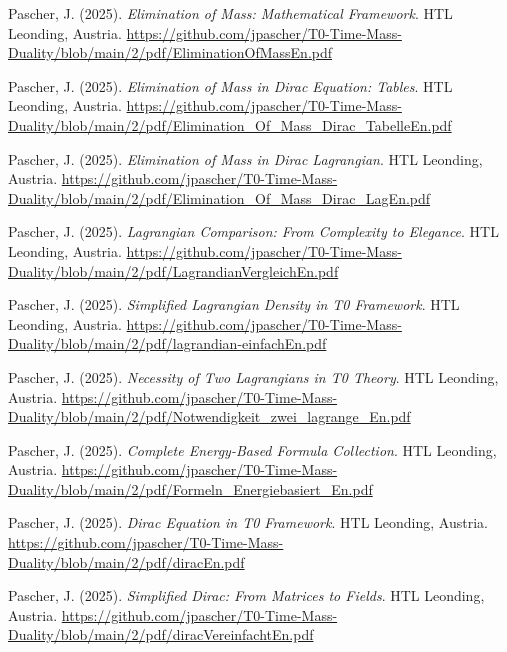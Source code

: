 \documentclass{article}
\begin{document}
\begin{thebibliography}{99}
		Pascher, J. (2025).
		\textit{Elimination of Mass: Mathematical Framework}.
		HTL Leonding, Austria.
		\url{https://github.com/jpascher/T0-Time-Mass-Duality/blob/main/2/pdf/EliminationOfMassEn.pdf}
		
		Pascher, J. (2025).
		\textit{Elimination of Mass in Dirac Equation: Tables}.
		HTL Leonding, Austria.
		\url{https://github.com/jpascher/T0-Time-Mass-Duality/blob/main/2/pdf/Elimination_Of_Mass_Dirac_TabelleEn.pdf}
		
		Pascher, J. (2025).
		\textit{Elimination of Mass in Dirac Lagrangian}.
		HTL Leonding, Austria.
		\url{https://github.com/jpascher/T0-Time-Mass-Duality/blob/main/2/pdf/Elimination_Of_Mass_Dirac_LagEn.pdf}
		
		
		Pascher, J. (2025).
		\textit{Lagrangian Comparison: From Complexity to Elegance}.
		HTL Leonding, Austria.
		\url{https://github.com/jpascher/T0-Time-Mass-Duality/blob/main/2/pdf/LagrandianVergleichEn.pdf}
		
		Pascher, J. (2025).
		\textit{Simplified Lagrangian Density in T0 Framework}.
		HTL Leonding, Austria.
		\url{https://github.com/jpascher/T0-Time-Mass-Duality/blob/main/2/pdf/lagrandian-einfachEn.pdf}
		
		Pascher, J. (2025).
		\textit{Necessity of Two Lagrangians in T0 Theory}.
		HTL Leonding, Austria.
		\url{https://github.com/jpascher/T0-Time-Mass-Duality/blob/main/2/pdf/Notwendigkeit_zwei_lagrange_En.pdf}
		
		Pascher, J. (2025).
		\textit{Complete Energy-Based Formula Collection}.
		HTL Leonding, Austria.
		\url{https://github.com/jpascher/T0-Time-Mass-Duality/blob/main/2/pdf/Formeln_Energiebasiert_En.pdf}
		
		
		Pascher, J. (2025).
		\textit{Dirac Equation in T0 Framework}.
		HTL Leonding, Austria.
		\url{https://github.com/jpascher/T0-Time-Mass-Duality/blob/main/2/pdf/diracEn.pdf}
		
		Pascher, J. (2025).
		\textit{Simplified Dirac: From Matrices to Fields}.
		HTL Leonding, Austria.
		\url{https://github.com/jpascher/T0-Time-Mass-Duality/blob/main/2/pdf/diracVereinfachtEn.pdf}
		

\end{thebibliography}
\end{document}

